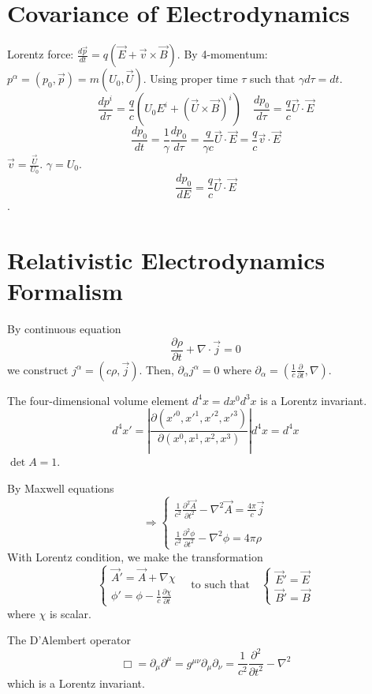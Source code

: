 \documentclass{article}
\begin{document}
	\section{Covariance of Electrodynamics}
	Lorentz force: $\frac{d\vec{p}}{dt} = q(\vec{E} + \vec{v} \times \vec{B})$.
	By 4-momentum: $p^{\alpha} = (p_0, \vec{p}) = m(U_0, \vec{U})$.
	Using proper time $\tau$ such that $\gamma d\tau = dt$.
	\[ \frac{dp^i}{d\tau} = \frac{q}{c} (U_0 E^i + (\vec{U} \times \vec{B})^i) \quad \frac{dp_0}{d\tau} = \frac{q}{c} \vec{U} \cdot \vec{E} \]
	\[ \frac{dp_0}{dt} = \frac{1}{\gamma} \frac{dp_0}{d\tau} = \frac{q}{\gamma c} \vec{U} \cdot \vec{E} = \frac{q}{c} \vec{v} \cdot \vec{E} \]
	$\vec{v} = \frac{\vec{U}}{U_0}$. $\gamma=U_0$.
	\[ \frac{d p_0}{d E} = \frac{q}{c} \vec{U} \cdot \vec{E} \].
	\section{Relativistic Electrodynamics Formalism}
	
	By continuous equation
	\[ \frac{\partial \rho}{\partial t} + \nabla \cdot \vec{j} = 0 \]
	we construct $j^\alpha = (c\rho, \vec{j})$.
	Then, $\partial_\alpha j^\alpha = 0$ where $\partial_\alpha = (\frac{1}{c}\frac{\partial}{\partial t}, \nabla)$.
	
	The four-dimensional volume element
	$d^4x = dx^0 d^3x$ is a Lorentz invariant.
	\[ d^4x' = \left| \frac{\partial(x'^0, x'^1, x'^2, x'^3)}{\partial(x^0, x^1, x^2, x^3)} \right| d^4x = d^4x \]
	$\det A = 1$.
	
	By Maxwell equations
	\[ \Rightarrow
	\begin{cases}
		\frac{1}{c^2}\frac{\partial^2 \vec{A}}{\partial t^2} - \nabla^2 \vec{A} = \frac{4\pi}{c} \vec{j} \\
		\\
		\frac{1}{c^2}\frac{\partial^2 \phi}{\partial t^2} - \nabla^2 \phi = 4\pi\rho
	\end{cases}
	\]
	With Lorentz condition, we make the transformation
	\[
	\begin{cases}
		\vec{A}' = \vec{A} + \nabla\chi \\
		\phi' = \phi - \frac{1}{c}\frac{\partial\chi}{\partial t}
	\end{cases}
	\quad \text{to such that} \quad
	\begin{cases}
		\vec{E}' = \vec{E} \\
		\vec{B}' = \vec{B}
	\end{cases}
	\]
	where $\chi$ is scalar.
	
	The D'Alembert operator
	\[ \Box = \partial_\mu \partial^\mu = g^{\mu\nu}\partial_\mu\partial_\nu = \frac{1}{c^2}\frac{\partial^2}{\partial t^2} - \nabla^2 \]
	which is a Lorentz invariant.
	
\end{document}
